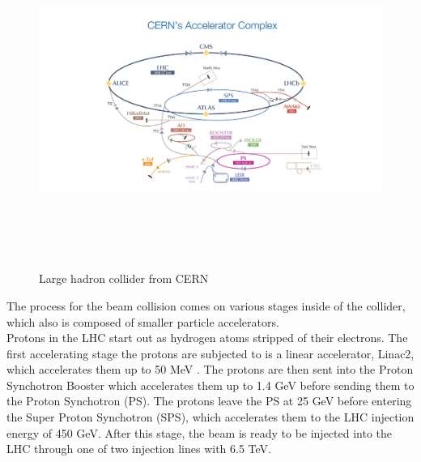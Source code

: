 \begin{linenumbers}
\pagebreak

\begin{figure}[!htbp]
\centering
\includegraphics[width=17cm,height=11cm]{Chapter1/cern.jpg}
\caption{Large hadron collider from CERN} \label{lhc}
\end{figure}


The process for the beam collision comes on various stages inside of the collider, which also is composed of smaller particle accelerators.\\
Protons in the LHC start out as hydrogen atoms stripped of their electrons. The first accelerating stage the protons are subjected to is a linear accelerator, Linac2,
which accelerates them up to 50 MeV . The protons are then sent into the
Proton Synchotron Booster which accelerates them up to 1.4 GeV before sending them to the Proton Synchotron (PS). The protons leave the PS at 25 GeV before entering the Super Proton Synchotron (SPS), which accelerates them to the LHC injection energy of 450 GeV. After this stage, the beam is ready to be injected into
the LHC through one of two injection lines with 6.5 TeV.\cite{cern3}


\end{linenumbers}
